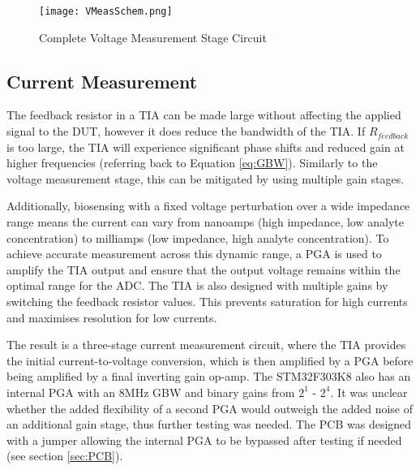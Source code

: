 \begin{figure}[H]
    \centering
    \texttt{[image: VMeasSchem.png]}
    \caption{Complete Voltage Measurement Stage Circuit}
    \label{fig:vmeas_stage_circuit}
\end{figure}

\subsection{Current Measurement}\label{subsec:design_cur}
The feedback resistor in a \ac{TIA} can be made large without affecting the applied signal to the \ac{DUT}, however it does reduce the bandwidth of the TIA. If $R_{feedback}$ is too large, the TIA will experience significant phase shifts and reduced gain at higher frequencies (referring back to Equation \ref{eq:GBW}). Similarly to the voltage measurement stage, this can be mitigated by using multiple gain stages.

Additionally, biosensing with a fixed voltage perturbation over a wide impedance range means the current can vary from nanoamps (high impedance, low analyte concentration) to milliamps (low impedance, high analyte concentration). To achieve accurate measurement across this dynamic range, a \ac{PGA} is used to amplify the TIA output and ensure that the output voltage remains within the optimal range for the \ac{ADC}. The TIA is also designed with multiple gains by switching the feedback resistor values. This prevents saturation for high currents and maximises resolution for low currents. 

The result is a three-stage current measurement circuit, where the TIA provides the initial current-to-voltage conversion, which is then amplified by a \ac{PGA} before being amplified by a final inverting gain op-amp. The STM32F303K8 also has an internal PGA with an 8MHz GBW and binary gains from $2^1$ - $2^4$. It was unclear whether the added flexibility of a second PGA would outweigh the added noise of an additional gain stage, thus further testing was needed. The PCB was designed with a jumper allowing the internal PGA to be bypassed after testing if needed (see section \ref{sec:PCB}).

